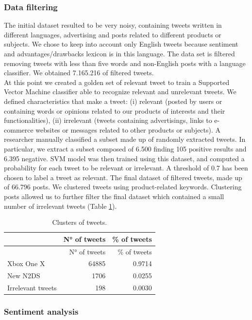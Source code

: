 \documentclass[]{book}
\theoremstyle{definition}
\theoremstyle{definition}
\theoremstyle{definition}
\theoremstyle{remark}
\begin{document}
\subsubsection*{Data filtering}\label{data-filtering}

The initial dataset resulted to be very noisy, containing tweets written
in different languages, advertising and posts related to different
products or subjects. We chose to keep into account only English tweets
because sentiment and advantages/drawbacks lexicon is in this language.
The data set is filtered removing tweets with less than five words and
non-English posts with a language classifier. We obtained 7.165.216 of
filtered tweets.\\
At this point we created a golden set of relevant tweet to train a
Supported Vector Machine classifier able to recognize relevant and
unrelevant tweets. We defined characteristics that make a tweet: (i)
relevant (posted by users or containing words or opinions related to our
products of interests and their functionalities), (ii) irrelevant
(tweets containing advertisings, links to e-commerce websites or
messages related to other products or subjects). A researcher manually
classified a subset made up of randomly extracted tweets. In particular,
we extract a subset composed of 6.500 finding 105 positive results and
6.395 negative. SVM model was then trained using this dataset, and
computed a probability for each tweet to be relevant or irrelevant. A
threshold of 0.7 has been chosen to label a tweet as relevant. The final
dataset of filtered tweets, made up of 66.796 posts. We clustered tweets
using product-related keywords. Clustering posts allowed us to further
filter the final dataset which contained a small number of irrelevant
tweets (Table \ref{tab:tweetab1}).

\begin{longtable}[]{@{}lrr@{}}
\caption{\label{tab:tweetab1} Clusters of tweets.}\tabularnewline
\toprule
& N° of tweets & \% of tweets\tabularnewline
\midrule
\endfirsthead
\toprule
& N° of tweets & \% of tweets\tabularnewline
\midrule
\endhead
Xbox One X & 64885 & 0.9714\tabularnewline
New N2DS & 1706 & 0.0255\tabularnewline
Irrelevant tweets & 198 & 0.0030\tabularnewline
\bottomrule
\end{longtable}

\subsubsection*{Sentiment analysis}\label{sentiment-analysis}
\end{document}
